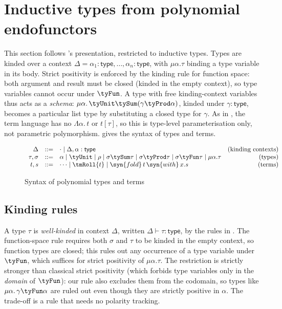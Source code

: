 \section{Inductive types from polynomial endofunctors}
\label{sec:polynomial-types}

This section follows \citet{nunes2023}'s presentation, restricted to inductive types. Types are kinded
over a context $\Delta = \alpha_1 : \mathsf{type}, \ldots, \alpha_n : \mathsf{type}$, with $\mu\alpha.\tau$
binding a type variable in its body. Strict positivity is enforced by the kinding rule for function space:
both argument and result must be closed (kinded in the empty context), so type variables cannot occur under
$\tyFun$. A type with free kinding-context variables thus acts as a \emph{schema}: $\mu\alpha.\,\tyUnit
\tySum (\gamma \tyProd \alpha)$, kinded under $\gamma : \mathsf{type}$, becomes a particular list type by
substituting a closed type for $\gamma$. As in \citet{nunes2023}, the term language has no $\Lambda\alpha.\,
t$ or $t[\tau]$, so this is type-level parameterisation only, not parametric polymorphism.
 gives the syntax of types and terms.

\begin{figure}
\[
\begin{array}{rclr}
   \Delta &::=& \cdot \mid \Delta, \alpha : \mathsf{type} & \text{(kinding contexts)} \\
   \tau, \sigma &::=& \alpha \mid \tyUnit \mid \rho \mid \sigma \tySum \tau \mid \sigma \tyProd \tau \mid
                      \sigma \tyFun \tau \mid \mu\alpha.\tau & \text{(types)} \\
   t, s &::=& \cdots \mid \tmRoll{t} \mid \syn{fold}\,t\,\syn{with}\,x.s & \text{(terms)}
\end{array}
\]
\caption{Syntax of polynomial types and terms}
\label{fig:polynomial-types:syntax}
\end{figure}

\subsection{Kinding rules}
\label{sec:polynomial-types:kinding}

A type $\tau$ is \emph{well-kinded} in context $\Delta$, written $\Delta \vdash \tau : \mathsf{type}$, by
the rules in . The function-space rule requires both $\sigma$ and $\tau$ to
be kinded in the empty context, so function types are closed; this rules out any occurrence of a type
variable under $\tyFun$, which suffices for strict positivity of $\mu\alpha.\tau$. The restriction is
strictly stronger than classical strict positivity (which forbids type variables only in the \emph{domain}
of $\tyFun$): our rule also excludes them from the codomain, so types like $\mu\alpha.\,\gamma \tyFun \alpha$
are ruled out even though they are strictly positive in $\alpha$. The trade-off is a rule that needs no
polarity tracking.

